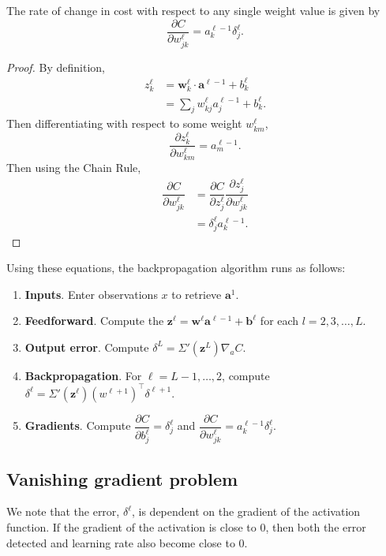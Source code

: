 \begin{proposition}
	The rate of change in cost with respect to any single weight value is given by
	\[
		\dfrac{\partial C}{\partial w_{jk}^\ell} = a_k^{\ell-1}\delta_j^\ell.
	\]
\end{proposition}
\begin{proof}
	By definition,
	\begin{align*}
		z_k^\ell & = \mathbf{w}_k^\ell\cdot\mathbf{a}^{\ell-1} + b_k^\ell \\
		& = \sum_jw_{kj}^\ell a_j^{\ell-1} + b_k^\ell.
	\end{align*}
	Then differentiating with respect to some weight $w_{km}^\ell$,
	\[
		\dfrac{\partial z_k^\ell}{\partial w_{km}^\ell} = a_m^{\ell-1}.
	\]
	Then using the Chain Rule,
	\begin{align*}	
		\dfrac{\partial C}{\partial w_{jk}^\ell} & = \dfrac{\partial C}{\partial z_j^\ell}\dfrac{\partial z_j^\ell}{\partial w_{jk}^\ell} \\
		& = \delta_j^\ell a_k^{\ell-1}.
	\end{align*}
\end{proof}


Using these equations, the backpropagation algorithm runs as follows:
\begin{enumerate}
	\item \textbf{Inputs}. Enter observations $x$ to retrieve $\mathbf{a}^1$.
	\item \textbf{Feedforward}. Compute the $\mathbf{z}^\ell = \mathbf{w}^\ell\mathbf{a}^{\ell-1} + \mathbf{b}^\ell$ for each $l = 2, 3,\ldots,L$.
	\item \textbf{Output error}. Compute $\delta^L = \Sigma'(\mathbf{z}^L)\nabla_aC$.
	\item \textbf{Backpropagation}. For $\ell = L-1, \ldots, 2$, compute $\delta^\ell =  \Sigma'(\mathbf{z}^\ell)(w^{\ell+1})^\intercal\delta^{\ell+1}$.
	\item \textbf{Gradients}. Compute $\dfrac{\partial C}{\partial b_j^\ell} = \delta_j^\ell$ and $\dfrac{\partial C}{\partial w_{jk}^\ell} = a_k^{\ell-1}\delta_j^\ell$.
\end{enumerate}


\subsection*{Vanishing gradient problem}\label{nnet-vanishinggradprob}
We note that the error, $\delta^\ell$, is dependent on the gradient of the activation function. If the gradient of the activation is close to 0, then both the error detected and learning rate also become close to 0.

